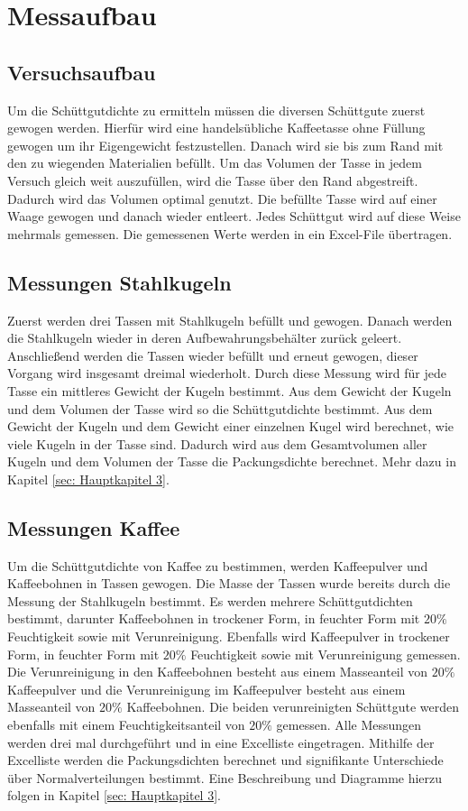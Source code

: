 \chapter{Messaufbau}
\label{sec: Hauptkapitel 2}
%
\section{Versuchsaufbau}
%
Um die Schüttgutdichte zu ermitteln müssen die diversen Schüttgute zuerst gewogen werden. Hierfür wird eine handelsübliche Kaffeetasse
ohne Füllung gewogen um ihr Eigengewicht festzustellen. Danach wird sie bis zum Rand mit den zu wiegenden Materialien befüllt. 
Um das Volumen der Tasse in jedem Versuch gleich weit auszufüllen, wird die Tasse über den Rand abgestreift. Dadurch 
wird das Volumen optimal genutzt. Die befüllte Tasse wird auf einer Waage gewogen und danach wieder entleert. Jedes Schüttgut 
wird auf diese Weise mehrmals gemessen. Die gemessenen Werte werden in ein Excel-File übertragen.
%
\section{Messungen Stahlkugeln}
%
Zuerst werden drei Tassen mit Stahlkugeln befüllt und gewogen. Danach werden die Stahlkugeln wieder in deren Aufbewahrungsbehälter 
zurück geleert. Anschließend werden die Tassen wieder befüllt und erneut gewogen, dieser Vorgang wird insgesamt dreimal wiederholt.
Durch diese Messung wird für jede Tasse ein mittleres Gewicht der Kugeln bestimmt. Aus dem Gewicht der Kugeln und dem Volumen der 
Tasse wird so die Schüttgutdichte bestimmt. Aus dem Gewicht der Kugeln und dem Gewicht einer einzelnen Kugel wird berechnet, 
wie viele Kugeln in der Tasse sind. Dadurch wird aus dem Gesamtvolumen aller Kugeln und dem Volumen der Tasse die Packungsdichte 
berechnet. Mehr dazu in Kapitel \ref{sec: Hauptkapitel 3}.
%
\section{Messungen Kaffee}
%
Um die Schüttgutdichte von Kaffee zu bestimmen, werden Kaffeepulver und Kaffeebohnen in Tassen gewogen. Die Masse der Tassen 
wurde bereits durch die Messung der Stahlkugeln bestimmt. Es werden mehrere Schüttgutdichten bestimmt, darunter Kaffeebohnen 
in trockener Form, in feuchter Form mit $20\%$ Feuchtigkeit sowie mit Verunreinigung. Ebenfalls wird Kaffeepulver in trockener Form, 
in feuchter Form mit $20\%$ Feuchtigkeit sowie mit Verunreinigung gemessen. Die Verunreinigung in den Kaffeebohnen besteht aus einem Masseanteil 
von $20\%$ Kaffeepulver und die Verunreinigung im Kaffeepulver besteht aus einem Masseanteil von $20\%$ Kaffeebohnen. 
Die beiden verunreinigten Schüttgute werden ebenfalls mit einem Feuchtigkeitsanteil von $20\%$ gemessen. Alle Messungen 
werden drei mal durchgeführt und in eine Excelliste eingetragen. Mithilfe der Excelliste werden die Packungsdichten berechnet 
und signifikante Unterschiede über Normalverteilungen bestimmt. Eine Beschreibung und Diagramme hierzu folgen in 
Kapitel \ref{sec: Hauptkapitel 3}.


